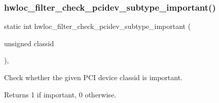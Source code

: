 \subsubsection{\texorpdfstring{hwloc\+\_\+filter\+\_\+check\+\_\+pcidev\+\_\+subtype\+\_\+important()}{hwloc\_filter\_check\_pcidev\_subtype\_important()}}
{\footnotesize\ttfamily static int hwloc\+\_\+filter\+\_\+check\+\_\+pcidev\+\_\+subtype\+\_\+important (\begin{DoxyParamCaption}\item[{unsigned}]{classid }\end{DoxyParamCaption})\hspace{0.3cm}{\ttfamily [inline]}, {\ttfamily [static]}}



Check whether the given P\+CI device classid is important. 

\begin{DoxyReturn}{Returns}
1 if important, 0 otherwise. 
\end{DoxyReturn}

